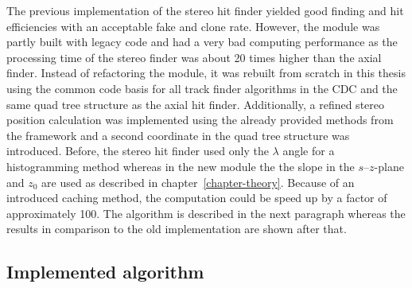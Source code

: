 The previous implementation of the stereo hit finder yielded good finding and hit efficiencies with an acceptable fake and clone rate. However, the module was partly built with legacy code and had a very bad computing performance as the processing time of the stereo finder was about 20 times higher than the axial finder. Instead of refactoring the module, it was rebuilt from scratch in this thesis using the common code basis for all track finder algorithms in the CDC and the same quad tree structure as the axial hit finder. Additionally, a refined stereo position calculation was implemented using the already provided methods from the framework and a second coordinate in the quad tree structure was introduced. Before, the stereo hit finder used only the $\lambda$ angle for a histogramming method whereas in the new module the the slope in the $s$--$z$-plane and $z_0$ are used as described in chapter~\ref{chapter-theory}. Because of an introduced caching method, the computation could be speed up by a factor of approximately 100. The algorithm is described in the next paragraph whereas the results in comparison to the old implementation are shown after that.

\subsection{Implemented algorithm}

